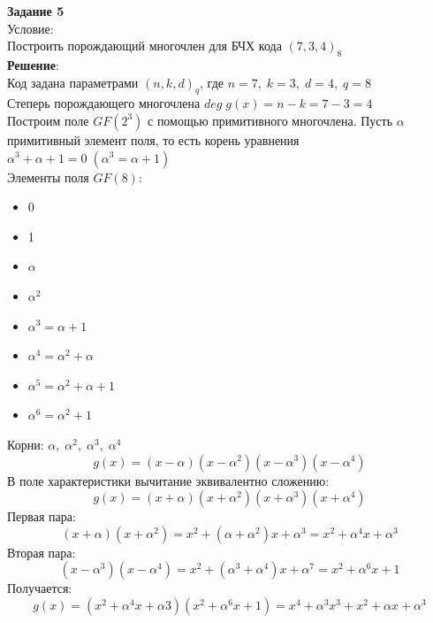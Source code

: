 \documentclass[12pt]{article}
\begin{document}
\begin{flushleft}
    \textbf{Задание 5} \\
    Условие: \\
    Построить порождающий многочлен для БЧХ кода $(7, 3, 4)_8$ \\

    \vspace{20pt}
    \textbf{Решение}: \\
    Код задана параметрами $(n, k, d)_q$, где $n=7, \; k=3, \; d=4, \; q=8$ \\
    Степерь порождающего многочлена $deg \; g(x) = n - k = 7 - 3 = 4$ \\
    Построим поле $GF(2^3)$ с помощью примитивного многочлена. Пусть $\alpha$ примитивный элемент поля, то есть корень уравнения $\alpha^3 + \alpha + 1 = 0 \;  (\alpha^3 = \alpha + 1) $\\
    Элементы поля $GF(8)$: \\
    \begin{itemize}
        \item 0 
        \item 1
        \item $\alpha$
        \item $\alpha^2$
        \item $\alpha^3 = \alpha + 1$
        \item $\alpha^4 = \alpha^2 + \alpha$
        \item $\alpha^5 = \alpha^2 + \alpha + 1$
        \item $\alpha^6 = \alpha^2 + 1$
    \end{itemize}
    Корни: $\alpha, \; \alpha^2, \; \alpha^3, \; \alpha^4$ \\
    \[ g(x) = (x - \alpha)(x - \alpha^2)(x - \alpha^3)(x - \alpha^4) \]
    В поле характеристики вычитание эквивалентно сложению: \\
    \[ g(x) = (x + \alpha)(x + \alpha^2)(x + \alpha^3)(x + \alpha^4) \]
    Первая пара: \\
    \[ (x + \alpha)(x + \alpha^2) = x^2 + (\alpha + \alpha^2)x + \alpha^3 = x^2 + \alpha^4x + \alpha^3 \]
    Вторая пара: \\
    \[ (x - \alpha^3)(x - \alpha^4) = x^2 + (\alpha^3 + \alpha^4)x + \alpha^7 = x^2 + \alpha^6x + 1 \]
    Получается: \\
    \[ g(x) = (x^2 + \alpha^4x + \alpha3)(x^2 + \alpha^6x + 1) = x^4 + \alpha^3x^3 + x^2 + \alpha x + \alpha^3 \]
\end{flushleft}
\end{document}
